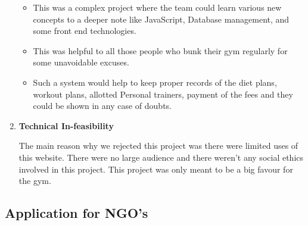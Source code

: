 \documentclass[fleqn,10pt]{../SelfArx} %
\begin{document}
\begin{enumerate}
\begin{itemize}
    \item	This was a complex project where the team could learn various new concepts to a deeper note like JavaScript, Database management, and some front end technologies.
  \item		This was helpful to all those people who bunk their gym regularly for some unavoidable excuses.
  \item		Such a system would help to keep proper records of the diet plans, workout plans, allotted
Personal trainers, payment of the fees and they could be shown in any case of doubts.
\end{itemize}

\item \textbf{Technical  In-feasibility}

The main reason why we rejected this project was there were limited uses of this website. There were no large audience and there weren’t any social ethics involved in this project.
This project was only meant to be a big favour for the gym.
\end{enumerate}

\subsection {Application for NGO's}
\end{document}

